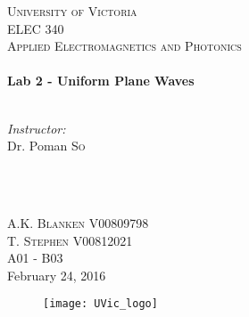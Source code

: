 \begin{titlepage}

\center
 
\textsc{\LARGE University of Victoria}\\[1cm] 	%
\textsc{\Large ELEC 340}\\[0.5cm] 			%
\textsc{\large Applied Electromagnetics and Photonics}\\[0.5cm] 		%


\HRule \\[0.4cm]
{\huge \bfseries Lab 2 - Uniform Plane Waves}\\[0.2cm] %
\HRule \\[1.5cm]
 
 
\begin{minipage}{0.7\textwidth}
\begin{flushleft} 

\large\emph{Instructor:} \\
Dr. Poman \textsc{So} \\
\vspace{12 pt}

\end{flushleft}
\end{minipage}
~
\begin{minipage}{0.1\textwidth}
\begin{flushright} \large

\vspace{12 pt}

\end{flushright}
\end{minipage}\\[2cm]


\Large A.K. \textsc{Blanken}
\large V00809798 \\
\Large T. \textsc{Stephen}
\large V00812021	\\
A01 - B03\\[1.5cm] 


{\large February 24, 2016}\\ %

\begin{figure}[b]
	\centering
	\texttt{[image: UVic\_logo]}
\end{figure}

\end{titlepage}
